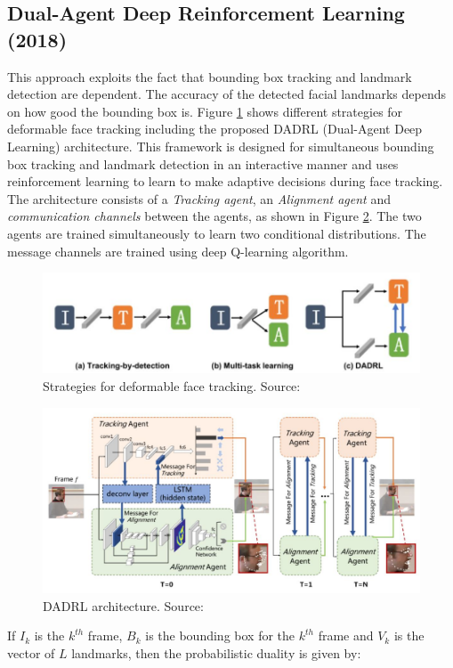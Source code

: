 \documentclass{llncs}
\begin{document}
\subsection{Dual-Agent Deep Reinforcement Learning (2018) \cite{dadrl}}
This approach exploits the fact that bounding box tracking and landmark detection are dependent. The accuracy of the detected facial landmarks depends on how good the bounding box is.
Figure \ref{deformable_face_tracking} shows different strategies for deformable face tracking including the proposed DADRL (Dual-Agent Deep Learning) architecture. This framework is designed for simultaneous bounding box tracking and landmark detection in an interactive manner and uses reinforcement learning to learn to make adaptive decisions during face tracking. The architecture consists of a \textit{Tracking agent}, an \textit{Alignment agent} and \textit{communication channels} between the agents, as shown in Figure \ref{dadrl_architecture}. The two agents are trained simultaneously to learn two conditional distributions.  The message channels are trained using deep Q-learning algorithm.

\begin{figure}
\centering
\includegraphics[scale=0.5]{Media/deformable_face_tracking}
\caption{Strategies for deformable face tracking. Source:\cite{dadrl}}
\label{deformable_face_tracking}
\end{figure}
\vspace{-1mm}
\begin{figure}
	\centering
	\includegraphics[scale=0.5]{Media/DADRL}
	\caption{DADRL architecture. Source:\cite{dadrl}}
	\label{dadrl_architecture}
\end{figure}
\vspace{-1mm}
If $I_k$ is the $k^{th}$ frame, $B_k$ is the bounding box for the $k^{th}$ frame and $V_k$ is the vector of $L$ landmarks, then the probabilistic duality is given by:  
\end{document}
